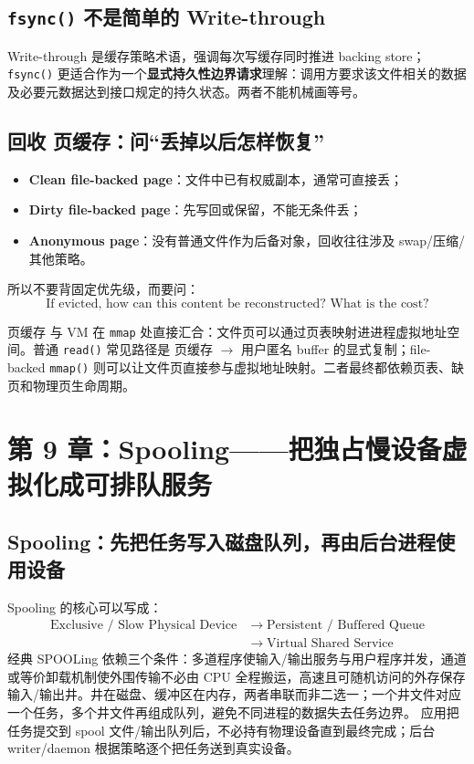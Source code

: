 \documentclass[UTF8,fontset=fandol,11pt,a4paper]{ctexart}
\newcommand{\kw}[1]{\textbf{#1}}
\newcommand{\code}[1]{\texttt{#1}}
\newcommand{\arr}{\;\longrightarrow\;}
\begin{document}
\subsection{\texorpdfstring{\code{fsync()}}{fsync()} 不是简单的 Write-through}
Write-through 是缓存策略术语，强调每次写缓存同时推进 backing store；\code{fsync()} 更适合作为一个\kw{显式持久性边界请求}理解：调用方要求该文件相关的数据及必要元数据达到接口规定的持久状态。两者不能机械画等号。

\subsection{回收 页缓存：问“丢掉以后怎样恢复”}
\begin{itemize}
  \item \kw{Clean file-backed page}：文件中已有权威副本，通常可直接丢；
  \item \kw{Dirty file-backed page}：先写回或保留，不能无条件丢；
  \item \kw{Anonymous page}：没有普通文件作为后备对象，回收往往涉及 swap/压缩/其他策略。
\end{itemize}
所以不要背固定优先级，而要问：
\[
\boxed{\text{If evicted, how can this content be reconstructed? What is the cost?}}
\]

\begin{bridge}[与虚拟内存专题的接口]
页缓存 与 VM 在 \code{mmap} 处直接汇合：文件页可以通过页表映射进进程虚拟地址空间。普通 \code{read()} 常见路径是 页缓存 $\to$ 用户匿名 buffer 的显式复制；file-backed \code{mmap()} 则可以让文件页直接参与虚拟地址映射。二者最终都依赖页表、缺页和物理页生命周期。
\end{bridge}

\section{第 9 章：Spooling——把独占慢设备虚拟化成可排队服务}

\subsection{Spooling：先把任务写入磁盘队列，再由后台进程使用设备}
Spooling 的核心可以写成：
\[
\boxed{
\begin{aligned}
\text{Exclusive / Slow Physical Device}
&\arr
\text{Persistent / Buffered Queue}\\
&\arr
\text{Virtual Shared Service}
\end{aligned}
}
\]
经典 SPOOLing 依赖三个条件：多道程序使输入/输出服务与用户程序并发，通道或等价卸载机制使外围传输不必由 CPU 全程搬运，高速且可随机访问的外存保存输入/输出井。井在磁盘、缓冲区在内存，两者串联而非二选一；一个井文件对应一个任务，多个井文件再组成队列，避免不同进程的数据失去任务边界。
应用把任务提交到 spool 文件/输出队列后，不必持有物理设备直到最终完成；后台 writer/daemon 根据策略逐个把任务送到真实设备。
\end{document}
